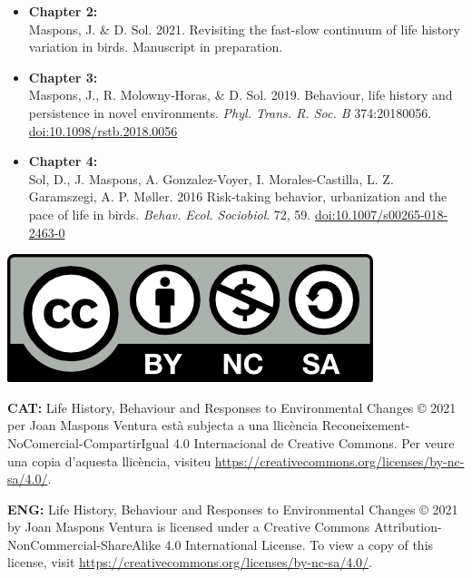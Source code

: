 \documentclass[12pt,a4paper,twoside,fleqn]{memoir}
\begin{document}
\begin{itemize}
  \item \textbf{Chapter 2:} \\
  Maspons, J. \& D. Sol. 2021. Revisiting the fast-slow continuum of life history variation in birds. Manuscript in preparation.
  
  \item \textbf{Chapter 3:} \\
  Maspons, J., R. Molowny‐Horas, \& D. Sol. 2019. Behaviour, life history and persistence in novel environments. \textit{Phyl. Trans. R. Soc. B} 374:20180056. \href{http://dx.doi.org/10.1098/rstb.2018.0056}{doi:10.1098/rstb.2018.0056}
  
  \item \textbf{Chapter 4:} \\
  Sol, D., J. Maspons, A. Gonzalez-Voyer, I. Morales-Castilla, L. Z. Garamszegi, A. P. M\o{}ller. 2016 Risk-taking behavior, urbanization and the pace of life in birds. \textit{Behav. Ecol. Sociobiol}. 72, 59. \href{http://dx.doi.org/10.1007/s00265-018-2463-0}{doi:10.1007/s00265-018-2463-0}

\end{itemize}

\bigskip

\begin{center}
 \includegraphics{./Figures/intro/CC_BY-NC-SA.png}
\end{center}

\textbf{CAT:} Life History, Behaviour and Responses to Environmental Changes © 2021 per Joan
Maspons Ventura està subjecta a una llicència
Reconeixement-NoComercial-CompartirIgual 4.0 Internacional de Creative Commons.
Per veure una copia d'aquesta llicència, visiteu
\url{https://creativecommons.org/licenses/by-nc-sa/4.0/}.

\medskip

\textbf{ENG:} Life History, Behaviour and Responses to Environmental Changes © 2021 by Joan
Maspons Ventura is licensed under a Creative Commons
Attribution-NonCommercial-ShareAlike 4.0 International License. To view a copy
of this license, visit \url{https://creativecommons.org/licenses/by-nc-sa/4.0/}.
\end{document}
